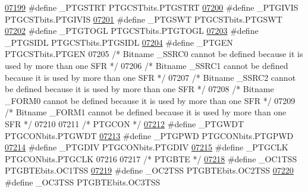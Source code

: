\begin{DoxyCode}
\hypertarget{a00009_source_l07199}{}\hyperlink{a00009_a28367be61faa0a595c34aa5761b42a23}{07199} \textcolor{preprocessor}{#define \_PTGSTRT PTGCSTbits.PTGSTRT}
\hypertarget{a00009_source_l07200}{}\hyperlink{a00009_a40893f6d936af2fbd9cecd108397721c}{07200} \textcolor{preprocessor}{#define \_PTGIVIS PTGCSTbits.PTGIVIS}
\hypertarget{a00009_source_l07201}{}\hyperlink{a00009_a70adc7566def349f6c456cb762b79203}{07201} \textcolor{preprocessor}{#define \_PTGSWT PTGCSTbits.PTGSWT}
\hypertarget{a00009_source_l07202}{}\hyperlink{a00009_afb5c8e1ad5f23ceae8e8edd477bf16d8}{07202} \textcolor{preprocessor}{#define \_PTGTOGL PTGCSTbits.PTGTOGL}
\hypertarget{a00009_source_l07203}{}\hyperlink{a00009_a59fe8beb7b889504ffbfdc9a4c50c206}{07203} \textcolor{preprocessor}{#define \_PTGSIDL PTGCSTbits.PTGSIDL}
\hypertarget{a00009_source_l07204}{}\hyperlink{a00009_a80a0d78b6d6c6943389fd159cb90789f}{07204} \textcolor{preprocessor}{#define \_PTGEN PTGCSTbits.PTGEN}
07205 \textcolor{comment}{/* Bitname \_SSRC0 cannot be defined because it is used by more than one SFR */}
07206 \textcolor{comment}{/* Bitname \_SSRC1 cannot be defined because it is used by more than one SFR */}
07207 \textcolor{comment}{/* Bitname \_SSRC2 cannot be defined because it is used by more than one SFR */}
07208 \textcolor{comment}{/* Bitname \_FORM0 cannot be defined because it is used by more than one SFR */}
07209 \textcolor{comment}{/* Bitname \_FORM1 cannot be defined because it is used by more than one SFR */}
07210 
07211 \textcolor{comment}{/* PTGCON */}
\hypertarget{a00009_source_l07212}{}\hyperlink{a00009_a5c8fa536d6751a4f25087bcc4bbf95a2}{07212} \textcolor{preprocessor}{#define \_PTGWDT PTGCONbits.PTGWDT}
\hypertarget{a00009_source_l07213}{}\hyperlink{a00009_aef6a1042a9cd5b6ed7c95ee1c6762486}{07213} \textcolor{preprocessor}{#define \_PTGPWD PTGCONbits.PTGPWD}
\hypertarget{a00009_source_l07214}{}\hyperlink{a00009_a239a880fca842b204c2c0d04dd8fc267}{07214} \textcolor{preprocessor}{#define \_PTGDIV PTGCONbits.PTGDIV}
\hypertarget{a00009_source_l07215}{}\hyperlink{a00009_a8fa661f07516b82aed78e416d65ad0a4}{07215} \textcolor{preprocessor}{#define \_PTGCLK PTGCONbits.PTGCLK}
07216 
07217 \textcolor{comment}{/* PTGBTE */}
\hypertarget{a00009_source_l07218}{}\hyperlink{a00009_a6ad73a7e2ab9bc45e4597e4ff40c8e4f}{07218} \textcolor{preprocessor}{#define \_OC1TSS PTGBTEbits.OC1TSS}
\hypertarget{a00009_source_l07219}{}\hyperlink{a00009_a52a19799e0cccda13d085170fb0eb4a3}{07219} \textcolor{preprocessor}{#define \_OC2TSS PTGBTEbits.OC2TSS}
\hypertarget{a00009_source_l07220}{}\hyperlink{a00009_ae16c0b64a6447eb5c2d85ffd5ae84130}{07220} \textcolor{preprocessor}{#define \_OC3TSS PTGBTEbits.OC3TSS}

\end{DoxyCode}
